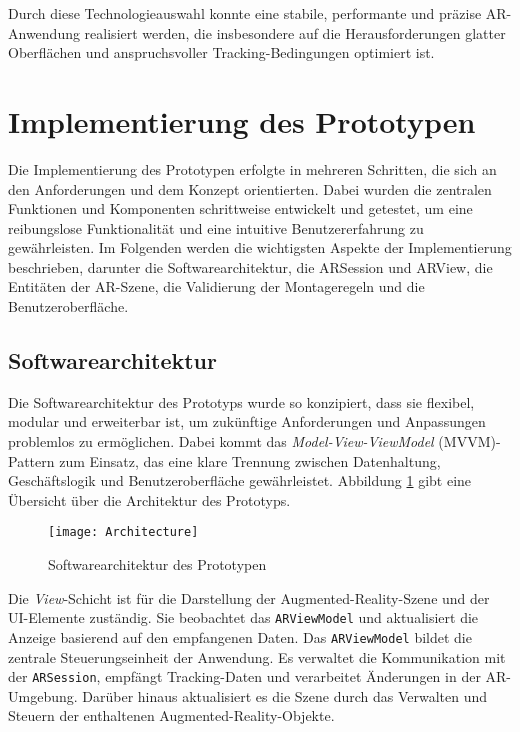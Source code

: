 Durch diese Technologieauswahl konnte eine stabile, performante und präzise AR-Anwendung realisiert werden, die insbesondere auf die Herausforderungen glatter Oberflächen und anspruchsvoller Tracking-Bedingungen optimiert ist.

\section{Implementierung des Prototypen}

Die Implementierung des Prototypen erfolgte in mehreren Schritten, die sich an den Anforderungen und dem Konzept orientierten. Dabei wurden die zentralen Funktionen und Komponenten schrittweise entwickelt und getestet, um eine reibungslose Funktionalität und eine intuitive Benutzererfahrung zu gewährleisten. Im Folgenden werden die wichtigsten Aspekte der Implementierung beschrieben, darunter die Softwarearchitektur, die ARSession und ARView, die Entitäten der AR-Szene, die Validierung der Montageregeln und die Benutzeroberfläche.

\subsection{Softwarearchitektur}

Die Softwarearchitektur des Prototyps wurde so konzipiert, dass sie flexibel, modular und erweiterbar ist, um zukünftige Anforderungen und Anpassungen problemlos zu ermöglichen. Dabei kommt das \textit{Model-View-ViewModel} (MVVM)-Pattern zum Einsatz, das eine klare Trennung zwischen Datenhaltung, Geschäftslogik und Benutzeroberfläche gewährleistet. Abbildung \ref{fig:Architecture} gibt eine Übersicht über die Architektur des Prototyps.

\begin{figure}[ht]
    \centering
    \texttt{[image: Architecture]}
    \caption{Softwarearchitektur des Prototypen}
    \label{fig:Architecture}
\end{figure}

Die \textit{View}-Schicht ist für die Darstellung der Augmented-Reality-Szene und der UI-Elemente zuständig. Sie beobachtet das \texttt{ARViewModel} und aktualisiert die Anzeige basierend auf den empfangenen Daten. Das \texttt{ARViewModel} bildet die zentrale Steuerungseinheit der Anwendung. Es verwaltet die Kommunikation mit der \texttt{ARSession}, empfängt Tracking-Daten und verarbeitet Änderungen in der AR-Umgebung. Darüber hinaus aktualisiert es die Szene durch das Verwalten und Steuern der enthaltenen Augmented-Reality-Objekte.

